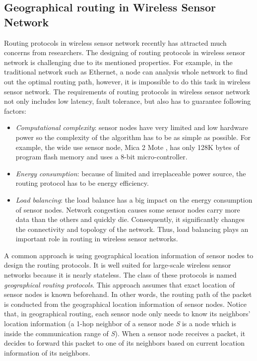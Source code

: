 \subsection{Geographical routing in Wireless Sensor Network}
Routing protocols in wireless sensor network recently has attracted much concerns from researchers. The designing of routing protocols in wireless sensor network is challenging due to its mentioned properties. For example, in the traditional network such as Ethernet, a node can analysis whole network to find out the optimal routing path, however, it is impossible to do this task in wireless sensor network. The requirements of routing protocols in wireless sensor network not only includes low latency, fault tolerance, but also has to guarantee following factors:

\begin{itemize}
\item \emph{Computational complexity}: sensor nodes have very limited and low hardware power so the complexity of the algorithm has to be as simple as possible. For example, the wide use sensor node, Mica 2 Mote \cite{mica2}, has only 128K bytes of program flash memory and uses a 8-bit micro-controller.
\item \emph{Energy consumption}: because of limited and irreplaceable power source, the routing protocol has to be energy efficiency.
\item \emph{Load balancing}: the load balance has a big impact on the energy consumption of sensor nodes. Network congestion causes some sensor nodes carry more data than the others and quickly die. Consequently, it significantly changes the connectivity and topology of the network. Thus, load balancing plays an important role in routing in wireless sensor networks.
\end{itemize} 

A common approach is using geographical location information of sensor nodes to design the routing protocols. It is well suited for large-scale wireless sensor networks because it is nearly stateless. The class of these protocols is named \emph{geographical routing protocols}. This approach assumes that exact location of sensor nodes is known beforehand. In other words, the routing path of the packet is conducted from the geographical location information of sensor nodes. Notice that, in geographical routing, each sensor node only needs to know its neighbors' location information (a 1-hop neighbor of a sensor node \emph{S} is a node which is inside the communication range of \emph{S}). When a sensor node receives a packet, it decides to forward this packet to one of its neighbors based on current location information of its neighbors. 

